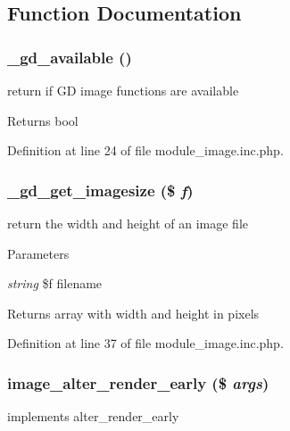 \subsection{Function Documentation}
\hypertarget{module__image_8inc_8php_a574d6d760e50b88ffa815cab30a5e634}{
\subsubsection[{\_\-gd\_\-available}]{\setlength{\rightskip}{0pt plus 5cm}\_\-gd\_\-available ()}}
\label{module__image_8inc_8php_a574d6d760e50b88ffa815cab30a5e634}
return if GD image functions are available

\begin{DoxyReturn}{Returns}
bool 
\end{DoxyReturn}


Definition at line 24 of file module\_\-image.inc.php.

\hypertarget{module__image_8inc_8php_a3c76028c34273e722c9691243377a208}{
\subsubsection[{\_\-gd\_\-get\_\-imagesize}]{\setlength{\rightskip}{0pt plus 5cm}\_\-gd\_\-get\_\-imagesize (\$ {\em f})}}
\label{module__image_8inc_8php_a3c76028c34273e722c9691243377a208}
return the width and height of an image file


\begin{DoxyParams}{Parameters}
\item[{\em string}]\$f filename\end{DoxyParams}
\begin{DoxyReturn}{Returns}
array with width and height in pixels 
\end{DoxyReturn}


Definition at line 37 of file module\_\-image.inc.php.

\hypertarget{module__image_8inc_8php_ab52d6b71a5c26dbb7e86653652a23251}{
\subsubsection[{image\_\-alter\_\-render\_\-early}]{\setlength{\rightskip}{0pt plus 5cm}image\_\-alter\_\-render\_\-early (\$ {\em args})}}
\label{module__image_8inc_8php_ab52d6b71a5c26dbb7e86653652a23251}
implements alter\_\-render\_\-early

